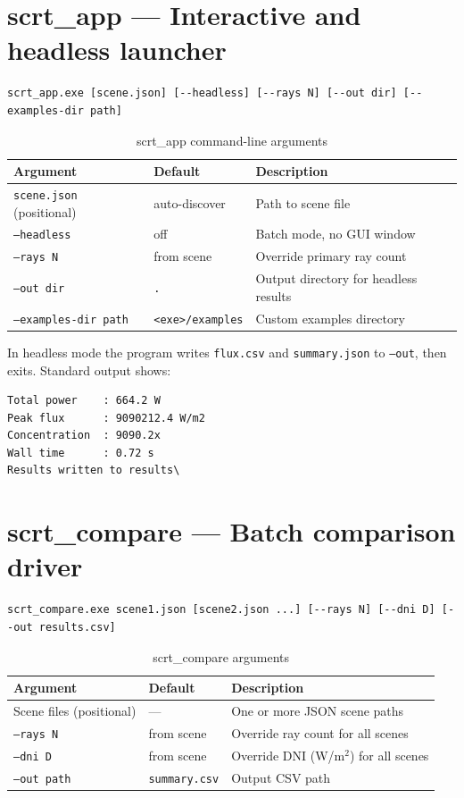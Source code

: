 \documentclass[12pt,a4paper]{report}
\begin{document}
\section{scrt\_app — Interactive and headless launcher}

\begin{lstlisting}[style=shell]
scrt_app.exe [scene.json] [--headless] [--rays N] [--out dir] [--examples-dir path]
\end{lstlisting}

\begin{table}[H]\centering
\caption{scrt\_app command-line arguments}
\begin{tabular}{lll}
\toprule
Argument & Default & Description \\
\midrule
\texttt{scene.json} (positional) & auto-discover & Path to scene file \\
\texttt{--headless}              & off  & Batch mode, no GUI window \\
\texttt{--rays N}                & from scene & Override primary ray count \\
\texttt{--out dir}               & \texttt{.}   & Output directory for headless results \\
\texttt{--examples-dir path}     & \texttt{<exe>/examples} & Custom examples directory \\
\bottomrule
\end{tabular}
\end{table}

In headless mode the program writes \texttt{flux.csv} and \texttt{summary.json} to
\texttt{--out}, then exits.  Standard output shows:
\begin{lstlisting}[style=shell]
Total power    : 664.2 W
Peak flux      : 9090212.4 W/m2
Concentration  : 9090.2x
Wall time      : 0.72 s
Results written to results\
\end{lstlisting}

\section{scrt\_compare — Batch comparison driver}

\begin{lstlisting}[style=shell]
scrt_compare.exe scene1.json [scene2.json ...] [--rays N] [--dni D] [--out results.csv]
\end{lstlisting}

\begin{table}[H]\centering
\caption{scrt\_compare arguments}
\begin{tabular}{lll}
\toprule
Argument & Default & Description \\
\midrule
Scene files (positional) & — & One or more JSON scene paths \\
\texttt{--rays N} & from scene & Override ray count for all scenes \\
\texttt{--dni D}  & from scene & Override DNI (W/m$^2$) for all scenes \\
\texttt{--out path} & \texttt{summary.csv} & Output CSV path \\
\bottomrule
\end{tabular}
\end{table}
\end{document}
